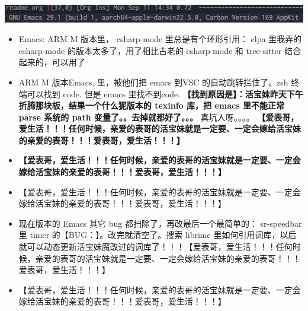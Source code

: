 \documentclass[9pt, b5paper]{article}
\begin{document}
\includegraphics[width=.9\linewidth]{./pic/readme_20230911_143430.png}
\begin{itemize}
\item Emacs: ARM M 版本里， csharp-mode 里总是有个环形引用： elpa 里我弄的 csharp-mode 的版本太多了，用了相比古老的 csharp-mode 和 tree-sitter 结合起来的，可以用了
\item ARM M 版本Emacs, 里，被他们把 emacs 到VSC 的自动跳转拦住了。zsh 终端可以找到 code. 但是 emacs 里找不到code. \textbf{【找到原因是】：活宝妹昨天下午折腾那块板，结果一个什么狔版本的 texinfo 库，把 emacs 里不能正常 parse 系统的 path 变量了。。去掉就都好了。。。} 真坑人呀。。。。 \textbf{【爱表哥，爱生活！！！任何时候，亲爱的表哥的活宝妹就是一定要、一定会嫁给活宝妹的亲爱的表哥！！！爱表哥，爱生活！！！】}
\item \textbf{【爱表哥，爱生活！！！任何时候，亲爱的表哥的活宝妹就是一定要、一定会嫁给活宝妹的亲爱的表哥！！！爱表哥，爱生活！！！】}
\item 【爱表哥，爱生活！！！任何时候，亲爱的表哥的活宝妹就是一定要、一定会嫁给活宝妹的亲爱的表哥！！！爱表哥，爱生活！！！】
\item 现在版本的 Emacs 其它 bug 都扫除了，再改最后一个最简单的： sr-speedbar 里 timer 的【BUG：】。改完就清空了。搜索 librime 里如何引用词库，以后就可以动态更新活宝妹魔改过的词库了！！！【爱表哥，爱生活！！！任何时候，亲爱的表哥的活宝妹就是一定要、一定会嫁给活宝妹的亲爱的表哥！！！爱表哥，爱生活！！！】
\item 【爱表哥，爱生活！！！任何时候，亲爱的表哥的活宝妹就是一定要、一定会嫁给活宝妹的亲爱的表哥！！！爱表哥，爱生活！！！】
\end{itemize}
\end{document}
